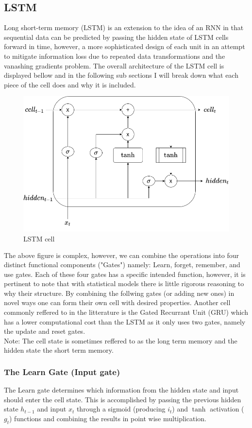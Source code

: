 \documentclass{article}
\begin{document}
\subsection{LSTM}
\label{sec:LSTM}
Long short-term memory (LSTM) is an extension to the idea of an RNN in that sequential data can be predicted by passing the hidden state of LSTM cells forward in time, however, a more sophisticated design of each unit in an attempt to mitigate information loss due to repeated data transformations and the vanashing gradients problem. The overall architecture of the LSTM cell is displayed bellow and in the following sub sections I will break down what each piece of the cell does and why it is included. 
\begin{figure}[H]
\caption{LSTM cell \cite{LSTM}}
\label{fig:RNN}
\includegraphics[scale=0.4]{LSTM_cell.png}
\end{figure}
The above figure is complex, however, we can combine the operations into four distinct functional components ("Gates") namely: Learn, forget, remember, and use gates. Each of these four gates has a specific intended function, however, it is pertinent to note that with statistical models there is little rigorous reasoning to why their structure. By combining the follwing gates (or adding new ones) in novel ways one can form their own cell with desired properties. Another cell commonly reffered to in the litterature is the Gated Recurrant Unit (GRU) which has a lower computational cost than the LSTM as it only uses two gates, namely the update and reset gates.\\
Note: The cell state is sometimes reffered to as the long term memory and the hidden state the short term memory.
\subsubsection{The Learn Gate (Input gate)} 
The Learn gate determines which information from the hidden state and input should enter the cell state. This is accomplished by passing the previous hidden state $h_{t-1}$ and input $x_t$ through a sigmoid (producing $i_t$) and $\tanh$ activation ($g_t$) functions and combining the results in point wise multiplication.
\end{document}
